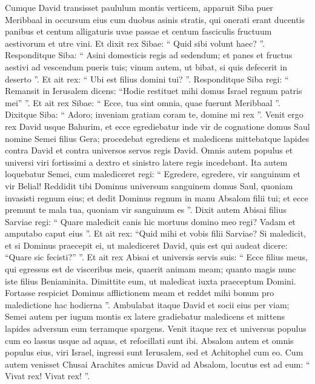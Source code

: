 \begin{biblechapter}
\begin{biblechapter}
\begin{biblechapter}
\begin{biblechapter}
\begin{biblechapter}
\begin{biblechapter}
\begin{biblechapter}
\begin{biblechapter}
\begin{biblechapter}
\begin{biblechapter}
\begin{biblechapter}
\begin{biblechapter}
\begin{biblechapter}
\begin{biblechapter}
\begin{biblechapter}
\begin{biblechapter}
\verse Cumque David transisset paululum montis verticem, apparuit Siba puer Meribbaal in occursum eius cum duobus asinis stratis, qui onerati erant ducentis panibus et centum alligaturis uvae passae et centum fasciculis fructuum aestivorum et utre vini. 
\verse Et dixit rex Sibae: “ Quid sibi volunt haec? ”. Responditque Siba: “ Asini domesticis regis ad sedendum; et panes et fructus aestivi ad vescendum pueris tuis; vinum autem, ut bibat, si quis defecerit in deserto ”. 
\verse Et ait rex: “ Ubi est filius domini tui? ”. Responditque Siba regi: “ Remansit in Ierusalem dicens: “Hodie restituet mihi domus Israel regnum patris mei” ”. 
\verse Et ait rex Sibae: “ Ecce, tua sint omnia, quae fuerunt Meribbaal ”. Dixitque Siba: “ Adoro; inveniam gratiam coram te, domine mi rex ”. 
 \verse Venit ergo rex David usque Bahurim, et ecce egrediebatur inde vir de cognatione domus Saul nomine Semei filius Gera; procedebat egrediens et maledicens 
\verse mittebatque lapides contra David et contra universos servos regis David. Omnis autem populus et universi viri fortissimi a dextro et sinistro latere regis incedebant. 
\verse Ita autem loquebatur Semei, cum malediceret regi: “ Egredere, egredere, vir sanguinum et vir Belial! 
\verse Reddidit tibi Dominus universum sanguinem domus Saul, quoniam invasisti regnum eius; et dedit Dominus regnum in manu Absalom filii tui; et ecce premunt te mala tua, quoniam vir sanguinum es ”. 
\verse Dixit autem Abisai filius Sarviae regi: “ Quare maledicit canis hic mortuus domino meo regi? Vadam et amputabo caput eius ”. 
\verse Et ait rex: “Quid mihi et vobis filii Sarviae? Si maledicit, et si Dominus praecepit ei, ut malediceret David, quis est qui audeat dicere: “Quare sic fecisti?” ”. 
\verse Et ait rex Abisai et universis servis suis: “ Ecce filius meus, qui egressus est de visceribus meis, quaerit animam meam; quanto magis nunc iste filius Beniaminita. Dimittite eum, ut maledicat iuxta praeceptum Domini. 
\verse Fortasse respiciet Dominus afflictionem meam et reddet mihi bonum pro maledictione hac hodierna ”. 
\verse Ambulabat itaque David et socii eius per viam; Semei autem per iugum montis ex latere gradiebatur maledicens et mittens lapides adversum eum terramque spargens. 
\verse Venit itaque rex et universus populus cum eo lassus usque ad aquas, et refocillati sunt ibi. 
\verse Absalom autem et omnis populus eius, viri Israel, ingressi sunt Ierusalem, sed et Achitophel cum eo. 
\verse Cum autem venisset Chusai Arachites amicus David ad Absalom, locutus est ad eum: “ Vivat rex! Vivat rex! ”. 

\end{biblechapter}
\end{biblechapter}
\end{biblechapter}
\end{biblechapter}
\end{biblechapter}
\end{biblechapter}
\end{biblechapter}
\end{biblechapter}
\end{biblechapter}
\end{biblechapter}
\end{biblechapter}
\end{biblechapter}
\end{biblechapter}
\end{biblechapter}
\end{biblechapter}
\end{biblechapter}
